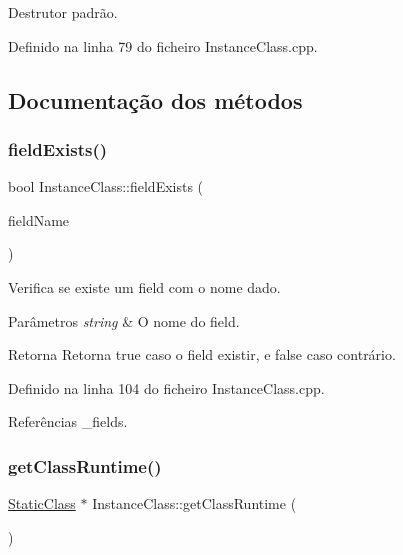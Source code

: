 Destrutor padrão. 



Definido na linha 79 do ficheiro Instance\+Class.\+cpp.



\subsection{Documentação dos métodos}
\mbox{\label{classInstanceClass_a284c7d0a062623c614a2f9440340070f}} 
\subsubsection{\texorpdfstring{field\+Exists()}{fieldExists()}}
{\footnotesize\ttfamily bool Instance\+Class\+::field\+Exists (\begin{DoxyParamCaption}\item[{string}]{field\+Name }\end{DoxyParamCaption})}



Verifica se existe um field com o nome dado. 


\begin{DoxyParams}{Parâmetros}
{\em string} & O nome do field. \\
\hline
\end{DoxyParams}
\begin{DoxyReturn}{Retorna}
Retorna {\ttfamily true} caso o field existir, e {\ttfamily false} caso contrário. 
\end{DoxyReturn}


Definido na linha 104 do ficheiro Instance\+Class.\+cpp.



Referências \+\_\+fields.

\mbox{\label{classInstanceClass_adf2af3015bb8f777a3181d85aa279de8}} 
\subsubsection{\texorpdfstring{get\+Class\+Runtime()}{getClassRuntime()}}
{\footnotesize\ttfamily \hyperlink{classStaticClass}{Static\+Class} $\ast$ Instance\+Class\+::get\+Class\+Runtime (\begin{DoxyParamCaption}{ }\end{DoxyParamCaption})}



